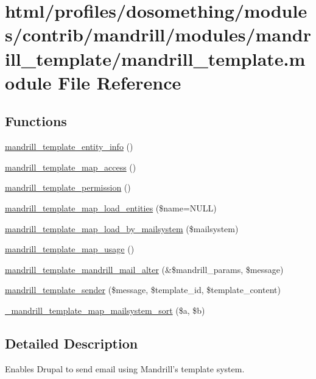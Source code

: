 \hypertarget{mandrill__template_8module}{
\section{html/profiles/dosomething/modules/contrib/mandrill/modules/mandrill\_\-template/mandrill\_\-template.module File Reference}
\label{mandrill__template_8module}
}
\subsection*{Functions}
\begin{DoxyCompactItemize}
\item 
\hyperlink{mandrill__template_8module_a388c001a4f19bb5e890e5962d9a9481a}{mandrill\_\-template\_\-entity\_\-info} ()
\item 
\hyperlink{mandrill__template_8module_a6a451669be92b42b30f8ef8ffa9cb315}{mandrill\_\-template\_\-map\_\-access} ()
\item 
\hyperlink{mandrill__template_8module_ae1d3285f08ccd1416a34b0f0c5276c64}{mandrill\_\-template\_\-permission} ()
\item 
\hyperlink{mandrill__template_8module_aa010cdfe57b90112df7d15324437e978}{mandrill\_\-template\_\-map\_\-load\_\-entities} (\$name=NULL)
\item 
\hyperlink{mandrill__template_8module_a7f2ce537053644baac78cca50aff8c8f}{mandrill\_\-template\_\-map\_\-load\_\-by\_\-mailsystem} (\$mailsystem)
\item 
\hyperlink{mandrill__template_8module_abcdfe09006615253c14cfaf0fe035ade}{mandrill\_\-template\_\-map\_\-usage} ()
\item 
\hyperlink{mandrill__template_8module_ab93754dd057f76eac9f42382cd35815e}{mandrill\_\-template\_\-mandrill\_\-mail\_\-alter} (\&\$mandrill\_\-params, \$message)
\item 
\hyperlink{mandrill__template_8module_aa9e98789848a212268bd3978937a7c54}{mandrill\_\-template\_\-sender} (\$message, \$template\_\-id, \$template\_\-content)
\item 
\hyperlink{mandrill__template_8module_a51089c73974e16c1b7c794f21f849534}{\_\-mandrill\_\-template\_\-map\_\-mailsystem\_\-sort} (\$a, \$b)
\end{DoxyCompactItemize}


\subsection{Detailed Description}
Enables Drupal to send email using Mandrill's template system. 

